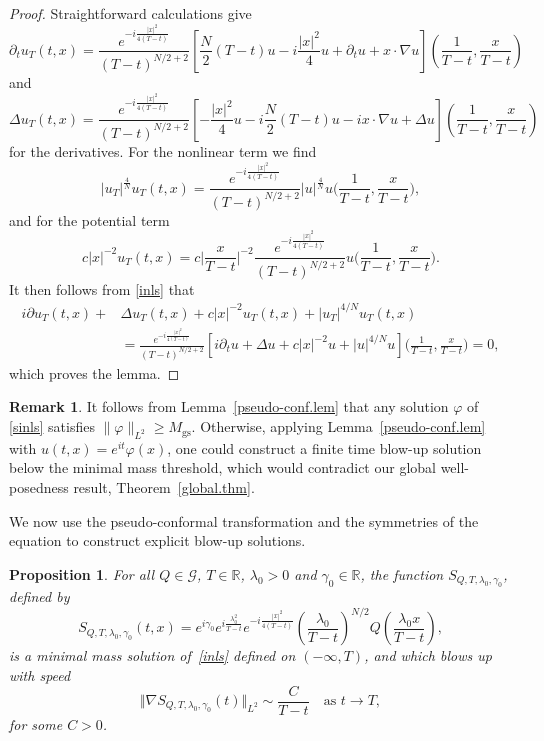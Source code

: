 \documentclass[reqno]{amsart}
\newcommand{\R}{\mathbb{R}}
\newcommand{\ffi}{\varphi}
\newcommand{\D}{\Delta}
\let\ge= \geqslant
\theoremstyle{plain}
\newtheorem{proposition}{Proposition}
\theoremstyle{definition}
\newtheorem{remark}{Remark}
\numberwithin{equation}{section}
\begin{document}
\begin{proof}
Straightforward calculations give
\[
\partial_t u_T(t,x) = 
\frac{e^{-i\frac{|x|^2}{4(T-t)}}}{(T-t)^{N/2+2}} \left[ \frac{N}{2}(T-t)u -i\frac{|x|^2}{4}u
+\partial_t u +x\cdot\nabla u \right]\! \left(\frac{1}{T-t},\frac{x}{T-t}\right)
\]
and
\[
\D u_T(t,x) = \frac{e^{-i\frac{|x|^2}{4(T-t)}}}{(T-t)^{N/2+2}} \left[ -\frac{|x|^2}{4}u -i\frac{N}{2}(T-t)u
-ix\cdot\nabla u +\D u\right]\! \left(\frac{1}{T-t},\frac{x}{T-t}\right)
\]
for the derivatives.
For the nonlinear term we find
\[
|u_T|^{\frac{4}{N}}u_T(t,x)=
\frac{e^{-i\frac{|x|^2}{4(T-t)}}}{(T-t)^{N/2+2}}|u|^{\frac{4}{N}}u\Big(\frac{1}{T-t},\frac{x}{T-t}\Big),
\]
and for the potential term
\[
c|x|^{-2}u_T(t,x)=
c\Big|\frac{x}{T-t}\Big|^{-2}\frac{e^{-i\frac{|x|^2}{4(T-t)}}}{(T-t)^{N/2+2}}u\Big(\frac{1}{T-t},\frac{x}{T-t}\Big).
\]
It then follows from \eqref{inls} that
\[
\begin{split}
i\partial u_T(t,x)+&\Delta u_T(t,x)+c|x|^{-2}u_T(t,x)+|u_T|^{4/N}u_T(t,x)
\\
&=\frac{e^{-i\frac{|x|^2}{4(T-t)}}}{(T-t)^{N/2+2}}[i\partial_tu+\Delta u+c|x|^{-2}u
+|u|^{4/N}u]\Big(\frac{1}{T-t},\frac{x}{T-t}\Big)=0,
\end{split}
\]
which proves the lemma.
\end{proof}


\begin{remark}\label{minmass.rem}
It follows from Lemma~\ref{pseudo-conf.lem} that any solution $\ffi$ of \eqref{sinls}
satisfies $\|\ffi\|_{L^2}\ge M_\mathrm{gs}$. Otherwise, applying Lemma~\ref{pseudo-conf.lem}
with $u(t,x)=e^{it}\ffi(x)$, one could construct a finite time blow-up solution below the minimal mass 
threshold, which would contradict our global well-posedness result, Theorem~\ref{global.thm}.
\end{remark}

We now use the pseudo-conformal transformation and the symmetries of the equation 
to construct explicit blow-up solutions.

\begin{proposition} \label{blow-up_sol.prop}
For all $Q\in\mathcal{G}$, $T\in\R$, $\lambda_0>0$ and $\gamma_0\in\R$, the function 
$S_{Q,T,\lambda_0,\gamma_0}$, defined by
\begin{equation} \label{S2.def}
S_{Q,T,\lambda_0,\gamma_0}(t,x) = e^{i\gamma_0} e^{i\frac{\lambda_0^2}{T-t}} e^{-i\frac{|x|^2}{4(T-t)}}
\left(\frac{\lambda_0}{T-t}\right)^{N/2}Q\left( \frac{\lambda_0x}{T-t} \right),
\end{equation}
is a minimal mass solution of~\eqref{inls} defined on $(-\infty,T)$, and which blows up with speed
\[
\Vert\nabla S_{Q,T,\lambda_0,\gamma_0}(t)\Vert_{L^2} \sim \frac{C}{T-t} \quad \text{as } t\to T,
\]
for some $C>0$.
\end{proposition}
\end{document}
